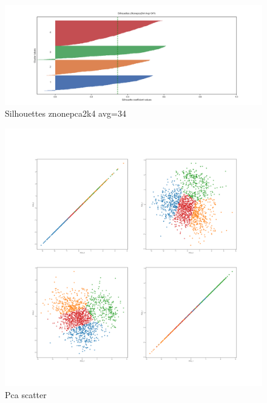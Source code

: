 \documentclass{article}
\begin{document}
\begin{figure}[H]
    \centering
    \includegraphics[width=1\columnwidth]{Crystal/actions_logtransform_zNonepca2k4/Silhouettes zNonepca2k4 Avg=34.png}
    \caption{Silhouettes znonepca2k4 avg=34}
    \label{fig:Crystalactionssilhouettesznonepca2k4avg=34}
\end{figure}
\begin{figure}[H]
    \centering
    \includegraphics[width=1\columnwidth]{Crystal/actions_logtransform_zNonepca2k4/PCA Scatter.png}
    \caption{Pca scatter}
    \label{fig:Crystalactionspcascatter}
\end{figure}
\end{document}
